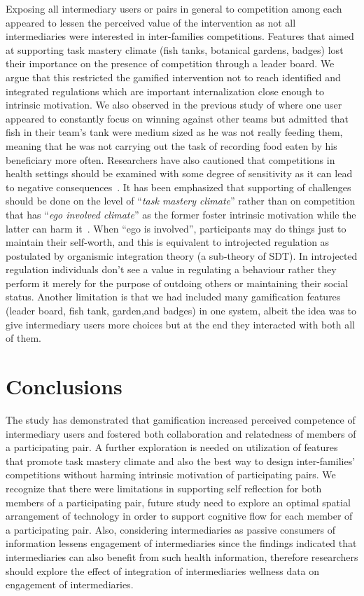 \documentclass{sig-alternate}
\begin{document}
Exposing all intermediary users or pairs in general to competition among each appeared to lessen the perceived value of the intervention as not all intermediaries were interested in inter-families competitions. Features that aimed at supporting task mastery climate (fish tanks, botanical gardens, badges) lost their importance on the presence of competition through a leader board. We argue that this restricted the gamified intervention not to reach identified and integrated regulations which are important internalization close enough to intrinsic motivation. We also observed in the previous study of where one user appeared to constantly focus on winning against other teams but admitted that fish in their team's tank were medium sized as he was not really feeding them, meaning that he was not carrying out the task of recording food eaten by his beneficiary more often. Researchers have also cautioned that competitions in health settings should be examined with some degree of sensitivity as it can lead to negative consequences~\cite{grimes2009toward}. It has been emphasized that supporting of  challenges should be done on the level of ``\emph{task mastery climate}'' rather than on competition that has ``\emph{ego involved climate}'' as the  former foster intrinsic motivation while the latter can harm it~\cite{saksono2015spaceship}. When ``ego is involved'', participants may do things just to maintain their self-worth, and this is equivalent to introjected regulation as postulated by organismic integration theory (a sub-theory of SDT)\cite{ryan2000:self}. In introjected regulation individuals don't see a value in regulating a behaviour rather they perform it merely for the purpose of outdoing others or maintaining their social status. Another limitation is that we had included many gamification features (leader board, fish tank, garden,and badges) in one system, albeit the idea was to give intermediary users more choices but at the end they interacted with both all of them.  

\section{Conclusions}
The study has demonstrated that gamification increased perceived competence of intermediary users and fostered both collaboration and relatedness of members of a participating pair. A further exploration is needed on utilization of features that promote task mastery climate and also the best way to design inter-families' competitions without harming intrinsic motivation of participating pairs. We recognize that there were limitations in supporting self reflection for both members of a participating pair, future study need to explore an optimal spatial arrangement of technology in order to support cognitive flow for each member of a participating pair. Also, considering intermediaries as passive consumers of information lessens engagement of intermediaries since the findings indicated that intermediaries can also benefit from such health information, therefore researchers should explore the effect of integration of intermediaries wellness data on engagement of intermediaries.
\end{document}
